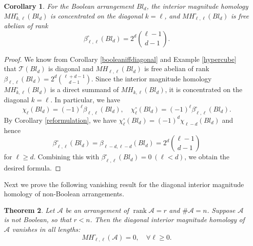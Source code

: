 \documentclass{amsart}
\numberwithin{equation}{section}
\newtheorem{thm}{Theorem}[section]
\newtheorem{cor}[thm]{Corollary}
\theoremstyle{plain}
\theoremstyle{remark}
\theoremstyle{definition}
\numberwithin{equation}{section}
\newcommand{\A}{\mathcal{A}}
\newcommand{\T}{\mathcal{T}}
\DeclareMathOperator{\rank}{rank}
\begin{document}
\begin{cor}\label{intMHbool}
    For the Boolean arrangement $Bl_d$, the interior magnitude homology $MH_{k,\ell}^{\circ}(Bl_d)$ is concentrated on the diagonal $k=\ell$, and $MH_{\ell,\ell}^{\circ}(Bl_d)$ is free abelian of rank
    \[
    \beta_{\ell,\ell}^{\circ}(Bl_d)=2^d\binom{\ell-1}{d-1}.
    \]
\end{cor}

\begin{proof}
    We know from Corollary \ref{booleaniffdiagonal} and Example \ref{hypercube} that $\T(Bl_d)$ is diagonal and $MH_{\ell,\ell}(Bl_d)$ is free abelian of rank $\beta_{\ell,\ell}(Bl_d)=2^d\binom{\ell+d-1}{d-1}$.
    Since the interior magnitude homology $MH_{k,\ell}^{\circ}(Bl_d)$ is a direct summand of $MH_{k,\ell}(Bl_d)$, it is concentrated on the diagonal $k=\ell$.
    In particular, we have
    \[
    \chi_\ell(Bl_d)=(-1)^\ell\beta_{\ell,\ell}(Bl_d),\quad \chi^\circ_{\ell}(Bl_d)=(-1)^\ell\beta^\circ_{\ell,\ell}(Bl_d).
    \]
    By Corollary \ref{reformulation}, we have $\chi^\circ_{\ell}(Bl_d)=(-1)^d\chi_{\ell-d}(Bl_d)$ and hence
    \[
    \beta^\circ _{\ell,\ell}(Bl_d)=\beta_{\ell-d,\ell-d}(Bl_d)=2^d\binom{\ell-1}{d-1}
    \]
    for $\ell\geq d$.
    Combining this with $\beta^\circ_{\ell,\ell}(Bl_d)=0\ (\ell<d)$, we obtain the desired formula.
\end{proof}


Next we prove the following vanishing result for the diagonal interior magnitude homology of non-Boolean arrangements.
\begin{thm}\label{nonbooldiagintMH}
    Let $\A$ be an arrangement of $\rank \A=r$ and $\#\A=n$. Suppose $\A$ is not Boolean, so that $r<n$. Then the diagonal interior magnitude homology of $\A$ vanishes in all lengths:
    \[
    MH_{\ell,\ell}^{\circ}(\A)=0,\quad \forall \ell\geq 0.
    \]
\end{thm}
\end{document}
